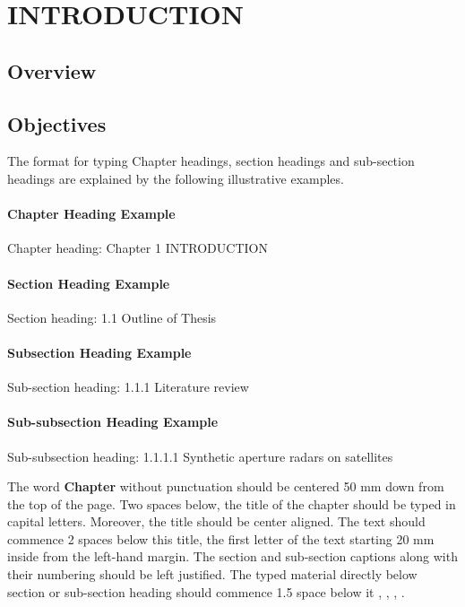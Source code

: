 \chapter{\uppercase{INTRODUCTION}}

\section{Overview}

\section{Objectives}

The format for typing Chapter headings, section headings and sub-section headings are explained by the following illustrative examples.

\subsubsection{Chapter Heading Example}
Chapter heading: Chapter 1 INTRODUCTION

\subsubsection{Section Heading Example}
Section heading: 1.1 Outline of Thesis

\subsubsection{Subsection Heading Example}
Sub-section heading: 1.1.1 Literature review

\subsubsection{Sub-subsection Heading Example}
Sub-subsection heading: 1.1.1.1 Synthetic aperture radars on satellites

The word \textbf{Chapter} without punctuation should be centered 50 mm down from the top of the page. Two spaces below, the title of the chapter should be typed in capital letters. Moreover, the title should be center aligned. The text should commence 2 spaces below this title, the first letter of the text starting 20 mm inside from the left-hand margin. The section and sub-section captions along with their numbering should be left justified. The typed material directly below section or sub-section heading should commence 1.5 space below it \cite{alishahi2009bounds}, \cite{hawley2004handbook}, \cite{conley1998nativity}, \cite{doan2002learning}. 

